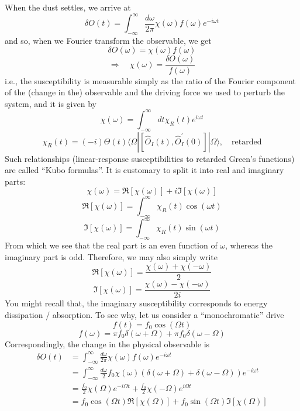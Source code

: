 When the dust settles, we arrive at
\[ \delta O\left( t \right) =\int_{-\infty}^{\infty}{\frac{d\omega}{2\pi}\chi \left( \omega \right) f\left( \omega \right) e^{-i\omega t}}\]
and so, when we Fourier transform the observable, we get
\[ \delta O\left( \omega \right) =\chi \left( \omega \right) f\left( \omega \right) \]
\[ \Rightarrow \quad \chi \left( \omega \right) =\frac{\delta O\left( \omega \right)}{f\left( \omega \right)}\]
i.e., the susceptibility is measurable simply as the ratio of the Fourier component of the (change in the) observable and the driving force we used to perturb the system, and it is given by
\[ \chi \left( \omega \right) =\int_{-\infty}^{\infty}{dt\chi _R\left( t \right) e^{i\omega t}}\]
\[ \chi _R\left( t \right) =\left( -i \right) \Theta \left( t \right) \langle \Omega |\left[ \hat{O}_I\left( t \right) ,\hat{O}_{I}^{'}\left( 0 \right) \right] |\Omega \rangle ,\quad \mathrm{retarded}\]
Such relationships (linear-response susceptibilities to retarded Green's functions) are called ``Kubo formulas''. It is customary to split it into real and imaginary parts:
\[ \chi \left( \omega \right) =\Re \left[ \chi \left( \omega \right) \right] +i\Im \left[ \chi \left( \omega \right) \right] \]
\[ \Re \left[ \chi \left( \omega \right) \right] =\int_{-\infty}^{\infty}{\chi _R\left( t \right) \cos \left( \omega t \right)}\]
\[ \Im \left[ \chi \left( \omega \right) \right] =\int_{-\infty}^{\infty}{\chi _R\left( t \right) \sin \left( \omega t \right)}\]
From which we see that the real part is an even function of $\omega$, whereas the imaginary part is odd. Therefore, we may also simply write
\[ \Re \left[ \chi \left( \omega \right) \right] =\frac{\chi \left( \omega \right) +\chi \left( -\omega \right)}{2}\]
\[ \Im \left[ \chi \left( \omega \right) \right] =\frac{\chi \left( \omega \right) -\chi \left( -\omega \right)}{2i}\]
You might recall that, the imaginary susceptibility corresponds to energy dissipation / absorption. To see why, let us consider a ``monochromatic'' drive
\[ f\left( t \right) =f_0\cos \left( \Omega t \right) \]
\[ f\left( \omega \right) =\pi f_0\delta \left( \omega +\Omega \right) +\pi f_0\delta \left( \omega -\Omega \right) \]
Correspondingly, the change in the physical observable is
\begin{align*}
    \delta O\left( t \right) &=\int_{-\infty}^{\infty}{\frac{d\omega}{2\pi}\chi \left( \omega \right) f\left( \omega \right) e^{-i\omega t}}\\
    &=\int_{-\infty}^{\infty}{\frac{d\omega}{2}f_0\chi \left( \omega \right) \left( \delta \left( \omega +\Omega \right) +\delta \left( \omega -\Omega \right) \right) e^{-i\omega t}}\\
    &=\frac{f_0}{2}\chi \left( \Omega \right) e^{-i\Omega t}+\frac{f_0}{2}\chi \left( -\Omega \right) e^{i\Omega t}\\
    &=f_0\cos \left( \Omega t \right) \Re \left[ \chi \left( \Omega \right) \right] +f_0\sin \left( \Omega t \right) \Im \left[ \chi \left( \Omega \right) \right]
\end{align*}
